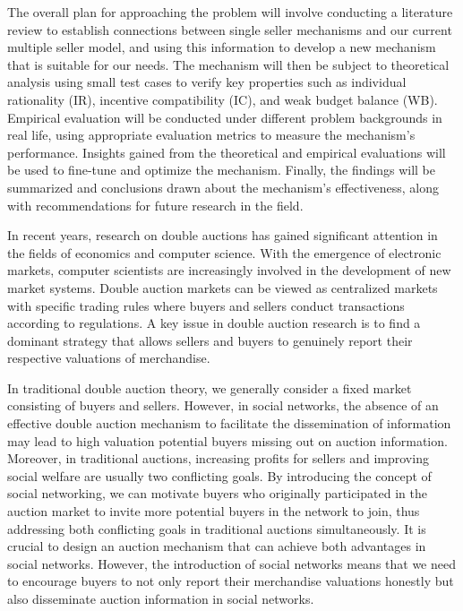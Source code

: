 The overall plan for approaching the problem will involve conducting a literature review to establish connections between single seller mechanisms and our current multiple seller model, and using this information to develop a new mechanism that is suitable for our needs. The mechanism will then be subject to theoretical analysis using small test cases to verify key properties such as individual rationality (IR), incentive compatibility (IC), and weak budget balance (WB). Empirical evaluation will be conducted under different problem backgrounds in real life, using appropriate evaluation metrics to measure the mechanism's performance. Insights gained from the theoretical and empirical evaluations will be used to fine-tune and optimize the mechanism. Finally, the findings will be summarized and conclusions drawn about the mechanism's effectiveness, along with recommendations for future research in the field.





In recent years, research on double auctions has gained significant attention in the fields of economics and computer science. With the emergence of electronic markets, computer scientists are increasingly involved in the development of new market systems. Double auction markets can be viewed as centralized markets with specific trading rules where buyers and sellers conduct transactions according to regulations. A key issue in double auction research is to find a dominant strategy that allows sellers and buyers to genuinely report their respective valuations of merchandise.

In traditional double auction theory, we generally consider a fixed market consisting of buyers and sellers. However, in social networks, the absence of an effective double auction mechanism to facilitate the dissemination of information may lead to high valuation potential buyers missing out on auction information. Moreover, in traditional auctions, increasing profits for sellers and improving social welfare are usually two conflicting goals. By introducing the concept of social networking, we can motivate buyers who originally participated in the auction market to invite more potential buyers in the network to join, thus addressing both conflicting goals in traditional auctions simultaneously. It is crucial to design an auction mechanism that can achieve both advantages in social networks. However, the introduction of social networks means that we need to encourage buyers to not only report their merchandise valuations honestly but also disseminate auction information in social networks.


